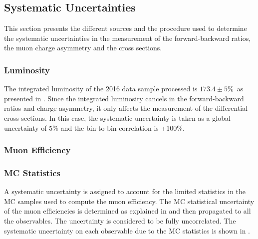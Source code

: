 \subsection{Systematic Uncertainties}\label{sec:WBoson_Analysis_Systematics}

This section presents the different sources and the procedure used to determine the systematic uncertainties in the measurement of the \W forward-backward ratios, the muon charge asymmetry and the \W cross sections.

\subsubsection{Luminosity}

The integrated luminosity of the 2016 \pPb data sample processed is $173.4 \pm 5\%$~\nbinv as presented in . Since the integrated luminosity cancels in the forward-backward ratios and charge asymmetry, it only affects the measurement of the \WToMuNu differential cross sections. In this case, the systematic uncertainty is taken as a global uncertainty of $5\%$ and the bin-to-bin correlation is +100\%.

\subsubsection{Muon Efficiency}

\subsubsection{MC Statistics}

A systematic uncertainty is assigned to account for the limited statistics in the MC samples used to compute the muon efficiency. The MC statistical uncertainty of the muon efficiencies is determined as explained in  and then propagated to all the observables. The uncertainty is considered to be fully uncorrelated. The systematic uncertainty on each observable due to the MC statistics is shown in .

